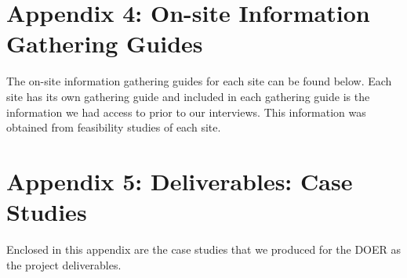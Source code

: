 \section*{Appendix 4: On-site Information Gathering Guides}
\par The on-site information gathering guides for each site can be found below. Each site has its own gathering guide and included in each gathering guide is the information we had access to prior to our interviews. This information was obtained from feasibility studies of each site.


\newpage
\section*{Appendix 5: Deliverables: Case Studies}
\par Enclosed in this appendix are the case studies that we produced for the DOER as the project deliverables.




\newpage
